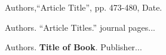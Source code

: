 \documentclass[11pt]{article}
\begin{document}
\pagebreak

\begin{thebibliography}{100} %

 Authors,``Article Title'', pp. 473-480, Date.

 Authors.  ``Article Titles.''  journal pages...

 Authors. {\bf Title of Book}.  Publisher...

\end{thebibliography}
\end{document}
